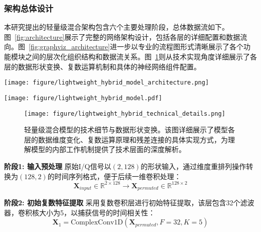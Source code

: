 \documentclass[conference]{IEEEtran}
\begin{document}
\subsubsection{架构总体设计}

本研究提出的轻量级混合架构包含六个主要处理阶段，总体数据流如下。图~\ref{fig:architecture}展示了完整的网络架构设计，包括各层的详细配置和数据流向。图~\ref{fig:graphviz_architecture}进一步以专业的流程图形式清晰展示了各个功能模块之间的层次化组织结构和数据流关系。图~\ref{fig:technical_details}则从技术实现角度详细展示了各层的数据形状变换、复数运算机制和具体的神经网络组件配置。

\begin{figure*}[htbp]
\centering
\texttt{[image: figure/lightweight\_hybrid\_model\_architecture.png]}
\caption{轻量级混合ComplexCNN-ResNet架构总体设计。该图展示了从输入I/Q信号到最终分类输出的完整数据流，包括复数卷积层、残差块和全局池化等关键组件的详细配置。}
\label{fig:architecture}
\end{figure*}

\begin{figure*}[htbp]
\centering
\texttt{[image: figure/lightweight\_hybrid\_model.pdf]}
\caption{轻量级混合模型的专业架构流程图（Graphviz生成）。该流程图以分层结构清晰展示了复数特征提取、残差学习、全局特征处理和实数分类四个主要阶段，每个模块都标注了详细的参数配置，为模型的完整数据流提供了直观的可视化表示。}
\label{fig:graphviz_architecture}
\end{figure*}

\begin{figure}[htbp]
\centering
\texttt{[image: figure/lightweight\_hybrid\_technical\_details.png]}
\caption{轻量级混合模型的技术细节与数据形状变换。该图详细展示了模型各层的数据维度变化、复数运算原理和残差连接的具体实现方式，为理解模型的内部工作机制提供了技术层面的深度解析。}
\label{fig:technical_details}
\end{figure}

\textbf{阶段1: 输入预处理}
原始I/Q信号以$(2, 128)$的形状输入，通过维度重排列操作转换为$(128, 2)$的时间序列格式，便于后续一维卷积处理：
\begin{equation}
\mathbf{X}_{input} \in \mathbb{R}^{2 \times 128} \rightarrow \mathbf{X}_{permuted} \in \mathbb{R}^{128 \times 2}
\end{equation}

\textbf{阶段2: 初始复数特征提取}
采用复数卷积层进行初始特征提取，该层包含32个滤波器，卷积核大小为5，以捕获信号的时间相关性：
\begin{equation}
\mathbf{X}_1 = \text{ComplexConv1D}(\mathbf{X}_{permuted}, F=32, K=5)
\end{equation}
\end{document}
